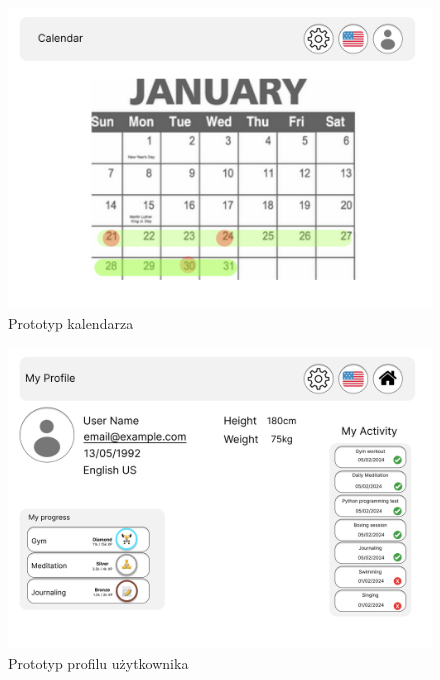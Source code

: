 \begin{figure}[h]
    \centering
    \includegraphics[width=1\textwidth]{Obrazy/prototypy/kalendarz.png}
    \caption{Prototyp kalendarza}
    \label{fig:my_label}
\end{figure}

\begin{figure}[h]
    \centering
    \includegraphics[width=1\textwidth]{Obrazy/prototypy/profil_uzytkownika.png}
    \caption{Prototyp profilu użytkownika}
    \label{fig:my_label}
\end{figure}

\clearpage